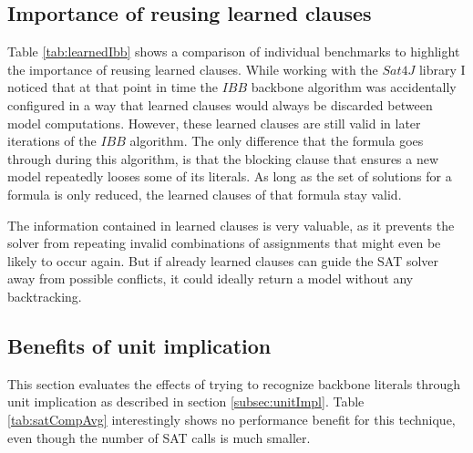 \subsection{Importance of reusing learned clauses}
Table \ref{tab:learnedIbb} shows a comparison of individual benchmarks to highlight the importance of reusing learned clauses. While working with the $Sat4J$ library I noticed that at that point in time the $IBB$ backbone algorithm was accidentally configured in a way that learned clauses would always be discarded between model computations. However, these learned clauses are still valid in later iterations of the $IBB$ algorithm. The only difference that the formula goes through during this algorithm, is that the blocking clause that ensures a new model repeatedly looses some of its literals. As long as the set of solutions for a formula is only reduced, the learned clauses of that formula stay valid.

The information contained in learned clauses is very valuable, as it prevents the solver from repeating invalid combinations of assignments that might even be likely to occur again. But if already learned clauses can guide the SAT solver away from possible conflicts, it could ideally return a model without any backtracking.

\subsection{Benefits of unit implication}
\label{ss:result_unit}
This section evaluates the effects of trying to recognize backbone literals through unit implication as described in section \ref{subsec:unitImpl}. Table \ref{tab:satCompAvg} interestingly shows no performance benefit for this technique, even though the number of SAT calls is much smaller.



